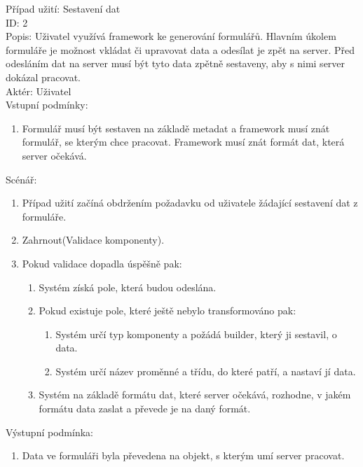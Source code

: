Případ užití: Sestavení dat\\
ID: 2\\
Popis: 
Uživatel využívá framework ke generování formulářů. Hlavním úkolem formuláře je možnost vkládat či upravovat data a odesílat je zpět na server. Před odesláním dat na server musí být tyto data zpětně sestaveny, aby s nimi server dokázal pracovat.
\\
Aktér: Uživatel\\
Vstupní podmínky:
\begin{enumerate}
\item Formulář musí být sestaven na základě metadat a framework musí znát formulář, se kterým chce pracovat. Framework musí znát formát dat, která server očekává.
\end{enumerate}
Scénář:
\begin{enumerate}
\item Případ užití začíná obdržením požadavku od uživatele žádající sestavení dat z formuláře.
\item Zahrnout(Validace komponenty).
\item Pokud validace dopadla úspěšně pak:
\begin{enumerate}
\item Systém získá pole, která budou odeslána.
\item Pokud existuje pole, které ještě nebylo transformováno pak:
\begin{enumerate}
\item Systém určí typ komponenty a požádá builder, který ji sestavil, o data.
\item Systém určí název proměnné a třídu, do které patří, a nastaví jí data.
\end {enumerate}
\item Systém na základě formátu dat, které server očekává, rozhodne, v jakém formátu data zaslat a převede je na daný formát.
\end{enumerate}
\end{enumerate}

Výstupní podmínka:
\begin{enumerate}
\item Data ve formuláři byla převedena na objekt, s kterým umí server pracovat.
\end{enumerate}

